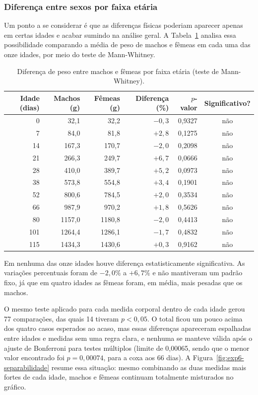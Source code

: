 \documentclass[12pt]{article}
\begin{document}
\subsubsection{Diferença entre sexos por faixa etária}

Um ponto a se considerar é que as diferenças físicas poderiam aparecer apenas em certas idades e acabar sumindo na análise geral. A Tabela~\ref{tab:exp6-dimorfismo} analisa essa possibilidade comparando a média de peso de machos e fêmeas em cada uma das onze idades, por meio do teste de Mann-Whitney.

\begin{table}[htbp]
\centering
\footnotesize
\caption{Diferença de peso entre machos e fêmeas por faixa etária (teste de Mann-Whitney).}
\label{tab:exp6-dimorfismo}
\begin{tabular}{rrrrrc}
\hline
\textbf{Idade (dias)} & \textbf{Machos (g)} & \textbf{Fêmeas (g)} &
\textbf{Diferença (\%)} & \textbf{$p$-valor} & \textbf{Significativo?} \\
\hline
0 &   32,1 &   32,2 & $-0,3$ & 0,9327 & não \\
7 &   84,0 &   81,8 & $+2,8$ & 0,1275 & não \\
14 &  167,3 &  170,7 & $-2,0$ & 0,2098 & não \\
21 &  266,3 &  249,7 & $+6,7$ & 0,0666 & não \\
28 &  410,0 &  389,7 & $+5,2$ & 0,0973 & não \\
38 &  573,8 &  554,8 & $+3,4$ & 0,1901 & não \\
52 &  800,6 &  784,5 & $+2,0$ & 0,3534 & não \\
66 &  987,9 &  970,2 & $+1,8$ & 0,5626 & não \\
80 & 1157,0 & 1180,8 & $-2,0$ & 0,4413 & não \\
101 & 1264,4 & 1286,1 & $-1,7$ & 0,4832 & não \\
115 & 1434,3 & 1430,6 & $+0,3$ & 0,9162 & não \\
\hline
\end{tabular}
\end{table}

Em nenhuma das onze idades houve diferença estatisticamente significativa. As variações percentuais foram de $-2,0\%$ a $+6,7\%$ e não mantiveram um padrão fixo, já que em quatro idades as fêmeas foram, em média, mais pesadas que os machos.

O mesmo teste aplicado para cada medida corporal dentro de cada idade gerou 77 comparações, das quais 14 tiveram $p < 0,05$. O total ficou um pouco acima dos quatro casos esperados ao acaso, mas essas diferenças apareceram espalhadas entre idades e medidas sem uma regra clara, e nenhuma se manteve válida após o ajuste de Bonferroni para testes múltiplos (limite de 0,00065, sendo que o menor valor encontrado foi $p = 0,00074$, para a coxa aos 66 dias). A Figura~\ref{fig:exp6-separabilidade} resume essa situação: mesmo combinando as duas medidas mais fortes de cada idade, machos e fêmeas continuam totalmente misturados no gráfico.
\end{document}
